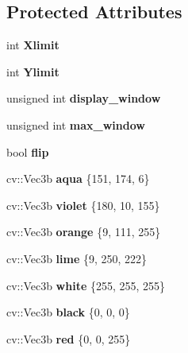 \subsection*{Protected Attributes}
\begin{DoxyCompactItemize}
\item 
\mbox{\label{classev_1_1vDraw_abb01af9562deeee5c654819da8f8ed48}} 
int {\bfseries Xlimit}
\item 
\mbox{\label{classev_1_1vDraw_ac8576f64274527917d90b3bd366d30cb}} 
int {\bfseries Ylimit}
\item 
\mbox{\label{classev_1_1vDraw_a1b39d618b4b05ae1af7c1f244ade51fc}} 
unsigned int {\bfseries display\+\_\+window}
\item 
\mbox{\label{classev_1_1vDraw_a3f0d8becb738e2c5b8f1035de3a68ec4}} 
unsigned int {\bfseries max\+\_\+window}
\item 
\mbox{\label{classev_1_1vDraw_a35a10630b77794a8275e5fa1ba211c28}} 
bool {\bfseries flip}
\item 
\mbox{\label{classev_1_1vDraw_ae6064a6b7d3e7ceac8c25023f65df312}} 
cv\+::\+Vec3b {\bfseries aqua} \{151, 174, 6\}
\item 
\mbox{\label{classev_1_1vDraw_a70ac397a8d4cbea13fc6935bf1b15ef5}} 
cv\+::\+Vec3b {\bfseries violet} \{180, 10, 155\}
\item 
\mbox{\label{classev_1_1vDraw_a1076d8ade59f536f331a32c4f01741cc}} 
cv\+::\+Vec3b {\bfseries orange} \{9, 111, 255\}
\item 
\mbox{\label{classev_1_1vDraw_a89d68710f6031add1a4fc1b152b49a73}} 
cv\+::\+Vec3b {\bfseries lime} \{9, 250, 222\}
\item 
\mbox{\label{classev_1_1vDraw_aa6e44598c13ee4f84d40b85416d5d5a7}} 
cv\+::\+Vec3b {\bfseries white} \{255, 255, 255\}
\item 
\mbox{\label{classev_1_1vDraw_a7b5f1fc47b30fed175f258447adc8cc4}} 
cv\+::\+Vec3b {\bfseries black} \{0, 0, 0\}
\item 
\mbox{\label{classev_1_1vDraw_a00d2b2e84b9ea5bf0ee3a04cd613d22a}} 
cv\+::\+Vec3b {\bfseries red} \{0, 0, 255\}
\end{DoxyCompactItemize}



